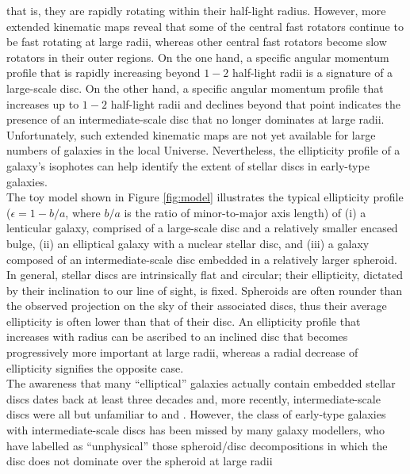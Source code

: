 \documentclass[useAMS,usenatbib,article]{mn2e}
\begin{document}
that is, they are rapidly rotating within their half-light radius.  
However, more extended kinematic maps \citep{arnold2014} reveal that 
some of the central fast rotators continue to be fast rotating at large radii, 
whereas other central fast rotators become slow rotators in their outer regions.
On the one hand, a specific angular momentum profile that is rapidly increasing beyond $1-2$ half-light radii 
is a signature of a large-scale disc. 
On the other hand, a specific angular momentum profile that increases up to $1-2$ half-light radii and declines beyond that point 
indicates the presence of an intermediate-scale disc that no longer dominates at large radii. 
Unfortunately, such extended kinematic maps are not yet available for large numbers of galaxies in the local Universe. 
Nevertheless, the ellipticity profile of a galaxy's isophotes can help identify the extent of stellar discs in early-type galaxies. \\
The toy model shown in Figure \ref{fig:model} illustrates the typical ellipticity profile 
($\epsilon = 1 - b/a$, where $b/a$ is the ratio of minor-to-major axis length) of 
(i) a lenticular galaxy, comprised of a large-scale disc and a relatively smaller encased bulge, 
(ii) an elliptical galaxy with a nuclear stellar disc, 
and (iii) a galaxy composed of an intermediate-scale disc embedded in a relatively larger spheroid. 
In general, stellar discs are intrinsically flat and circular; 
their ellipticity, dictated by their inclination to our line of sight, is fixed. 
Spheroids are often rounder than the observed projection on the sky of their associated discs, 
thus their average ellipticity is often lower than that of their disc. 
An ellipticity profile that increases with radius can be ascribed to an inclined disc that becomes progressively more important at large radii, 
whereas a radial decrease of ellipticity signifies the opposite case. \\
The awareness that many ``elliptical'' galaxies actually contain embedded stellar discs 
dates back at least three decades 
\citep{capaccioli1987,carter1987,rixwhite1990,bender1990,scorzabender1990,nieto1991,rixwhite1992,scorzabender1995,
donofrio1995,graham1998fornax,scorza1998,scorzavandenbosch1998} and, 
more recently, intermediate-scale discs were all but unfamiliar to \cite{kormendybender2012} and \cite{krajnovic2013etal}. 
However, the class of early-type galaxies with intermediate-scale discs has been missed by many galaxy modellers, 
who have labelled as ``unphysical'' \citep{allen2006} those spheroid/disc decompositions in which the disc does not dominate over the spheroid at large radii 
\end{document}
